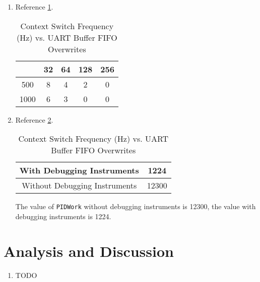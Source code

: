 \documentclass[12pt]{article}
\begin{document}
\begin{enumerate}
\item  Reference \cref{tab:fifo-perf}.
  \begin{table}[h]
    \centering
    \begin{tabular}[H]{c|c|c|c|c}
           & 32 & 64 & 128 & 256 \\ \hline
      500  & 8  & 4  & 2   & 0   \\ \hline
      1000 & 6  & 3  & 0   & 0   \\ \hline
    \end{tabular}
    \caption{Context Switch Frequency (Hz) vs. UART Buffer FIFO Overwrites}
    \label{tab:fifo-perf}
  \end{table}
\item Reference \cref{tab:debugging-instruments-perf}.
  \begin{table}[h]
    \centering
    \begin{tabular}[H]{c|c}
      With Debugging Instruments & 1224 \\ \hline
      Without Debugging Instruments & 12300 \\
    \end{tabular}
    \caption{Context Switch Frequency (Hz) vs. UART Buffer FIFO Overwrites}
    \label{tab:debugging-instruments-perf}
  \end{table}
  The value of \verb|PIDWork| without debugging instruments is
    12300, the value with debugging instruments is 1224.
\end{enumerate}

\section{Analysis and Discussion}
\begin{enumerate}
\item {\huge \color{red} TODO}
\end{enumerate}
\end{document}
